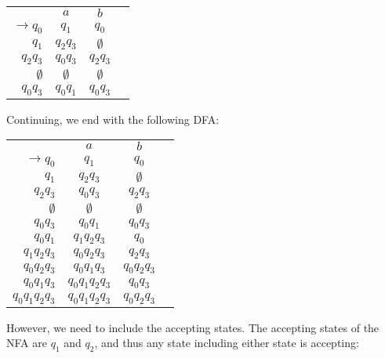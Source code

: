 \begin{center}\begin{tabular}{r c c r}
         & \(a\) & \(b\) & \\\cmidrule{2-3}
    \(\to q_0\) & \(q_1\) & \(q_0\) &  \\
          \(q_1\) & \(q_2q_3\) & \(\emptyset \) & \\
          \(q_2q_3\) & \(q_0q_3\) & \(q_2q_3\) & \\
          \(\emptyset \) & \(\emptyset \) & \(\emptyset \) &\\
          \(q_0q_3\) & \(q_0q_1\) & \(q_0q_3\) & 
\end{tabular}\end{center}

Continuing, we end with the following DFA\@:

\begin{center}\begin{tabular}{r c c r}
         & \(a\) & \(b\) & \\\cmidrule{2-3}
    \(\to q_0\) & \(q_1\) & \(q_0\) &  \\
          \(q_1\) & \(q_2q_3\) & \(\emptyset \) & \\
          \(q_2q_3\) & \(q_0q_3\) & \(q_2q_3\) & \\
          \(\emptyset \) & \(\emptyset \) & \(\emptyset \) &\\
          \(q_0q_3\) & \(q_0q_1\) & \(q_0q_3\) & \\
          \(q_0q_1\) & \(q_1q_2q_3\) & \(q_0\) & \\
          \(q_1q_2q_3\) & \(q_0q_2q_3\) & \(q_2q_3\) & \\
          \(q_0q_2q_3\) & \(q_0q_1q_3\) & \(q_0q_2q_3\) & \\
          \(q_0q_1q_3\) & \(q_0q_1q_2q_3\) & \(q_0q_3\) & \\
          \(q_0q_1q_2q_3\) & \(q_0q_1q_2q_3\) & \(q_0q_2q_3\) & \\
\end{tabular}\end{center}

However, we need to include the accepting states. The accepting states of the NFA are \(q_1\) and \(q_2\), and thus any state including either state is accepting:

